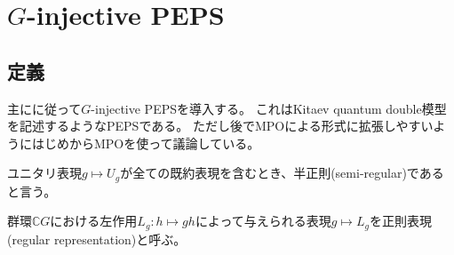 \documentclass[\main/main.tex]{subfiles}
\begin{document}
\section{$G$-injective PEPS}
\subsection{定義}
主に\cite{schuchPEPSGroundStates2010, sahinogluCharacterizingTopologicalOrder2021, simonTopologicalQuantum2023}に従って$G$-injective PEPSを導入する。
これはKitaev quantum double模型\cite{kitaevFaulttolerantQuantumComputation1997}を記述するようなPEPSである。
ただし後でMPOによる形式に拡張しやすいようにはじめからMPOを使って議論している。

\begin{definition}[半正則表現]\label{def: semireg}
    ユニタリ表現$g ↦ U_g$が全ての既約表現を含むとき、半正則(semi-regular)であると言う。
\end{definition}

\begin{definition}[正則表現]\label{def: regrep}
    群環$ℂG$における左作用$L_g: h ↦ gh$によって与えられる表現$g ↦ L_g$を正則表現(regular representation)と呼ぶ。
\end{definition}
\end{document}
